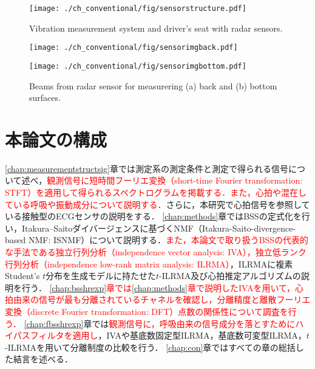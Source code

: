 \begin{figure}[!t]
\centering
\texttt{[image: ./ch\_conventional/fig/sensorstructure.pdf]}
\caption{Vibration measurement system and driver's seat with radar sensors.}
\label{fig:sensorstructure}
\end{figure}

\begin{figure}[htbp]
      \begin{minipage}[t]{0.45\hsize}
        \centering
        \texttt{[image: ./ch\_conventional/fig/sensorimgback.pdf]}
        \label{fig:sensorimgback}
      \end{minipage} 
      \begin{minipage}[t]{0.45\hsize}
        \centering
        \texttt{[image: ./ch\_conventional/fig/sensorimgbottom.pdf]}
        \label{fig:sensorimgbottom}
      \end{minipage} 
     \caption{Beams from radar sensor for measurering (a) back and (b) bottom surfaces.}
     \label{fig:sensorimg}
  \end{figure}


\section{本論文の構成}
\ref{chap:measurementstructsig}章では測定系の測定条件と測定で得られる信号について述べ，\textcolor{red}{観測信号に短時間フーリエ変換（short-time Fourier transformation: STFT）を適用して得られるスペクトログラムを掲載する．また，心拍や混在している呼吸や振動成分について説明する．}さらに，本研究で心拍信号を参照している接触型のECGセンサの説明をする．
\ref{chap:methods}章ではBSSの定式化を行い，Itakura--Saitoダイバージェンスに基づくNMF（Itakura-Saito-divergence-based NMF: ISNMF）について説明する．\textcolor{red}{また，本論文で取り扱うBSSの代表的な手法である独立行列分析（independence vector analysis: IVA），独立低ランク行列分析（independence low-rank matrix analysis: ILRMA）}，ILRMAに複素Student's $t$分布を生成モデルに持たせた$t$-ILRMA及び心拍推定アルゴリズムの説明を行う．
\textcolor{red}{\ref{chap:bsshrexp}章では\ref{chap:methods}章で説明したIVAを用いて，心拍由来の信号が最も分離されているチャネルを確認し，分離精度と離散フーリエ変換（discrete Fourier transformation: DFT）点数の関係性について調査を行う．}
\ref{chap:fbsshrexp}章では\textcolor{red}{観測信号に，呼吸由来の信号成分を落とすためにハイパスフィルタを適用し}，IVAや基底数固定型ILRMA，基底数可変型ILRMA，$t$-ILRMAを用いて分離制度の比較を行う．
\ref{chap:con}章ではすべての章の総括した結言を述べる．